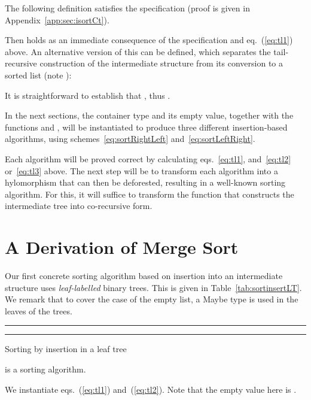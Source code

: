 \documentclass[a4paper,11pt]{llncs}
\begin{document}
The following definition satisfies the specification (proof is given
in Appendix~\ref{app:sec:isortCt}).

Then  holds as an immediate
consequence of the specification and eq.~(\ref{eq:tl1}) above.
An alternative version of this can be defined, which separates the
tail-recursive construction of the intermediate structure from its
conversion to a sorted list (note ):

It is straightforward to establish that , thus .





In the next sections, the container type and its empty value, together
with the functions  and , will be instantiated to
produce three different insertion-based algorithms, using
schemes~\ref{eq:sortRightLeft} and~\ref{eq:sortLeftRight}. 

Each algorithm will be proved correct by calculating
eqs.~\ref{eq:tl1}, and~\ref{eq:tl2} or~\ref{eq:tl3} above. The next
step will be to transform each algorithm into a hylomorphism that can
then be deforested, resulting in a well-known sorting algorithm.  For
this, it will suffice to transform the function that constructs the
intermediate tree into co-recursive form.





\section{A Derivation of Merge Sort}
\label{sec:mergesort}

Our first concrete sorting algorithm based on insertion into an
intermediate structure uses \emph{leaf-labelled} binary trees.  This
is given in Table~\ref{tab:sortinsertLT}. We remark that to cover the
case of the empty list, a Maybe type is used in the leaves of the
trees.


\begin{table}[tb]
\hrule

\hrule
\caption{Sorting by insertion in a leaf tree}
\label{tab:sortinsertLT}
\end{table}


\begin{proposition} \label{prop:P1}
 is a sorting algorithm.
\end{proposition}

\proof
We instantiate eqs.~(\ref{eq:tl1}) and~(\ref{eq:tl2}). Note that
the empty value here is .
\end{document}
